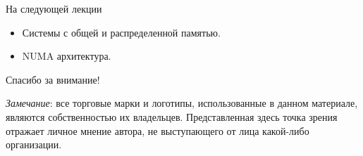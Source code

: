 \begin{frame}{На следующей лекции}
\begin{itemize}
\ifsbertech
    \item Системы с общей и распределенной памятью.
    \item NUMA архитектура.
\fi
\end{itemize}
\end{frame}

\begin{frame}

{\huge{Спасибо за внимание!}\par}

\vfill

\tiny{\textit{Замечание}: все торговые марки и логотипы, использованные в данном материале, являются собственностью их владельцев. Представленная здесь точка зрения отражает личное мнение автора, не выступающего от лица какой-либо организации.}

\end{frame}


